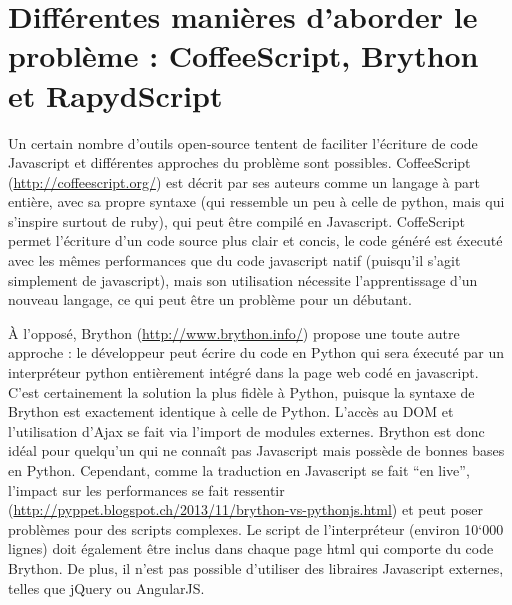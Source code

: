 \documentclass[letterpaper,10pt,french]{sphinxmanual}
\begin{document}
\chapter{Différentes manières d'aborder le problème : CoffeeScript, Brython et RapydScript}
\label{rapydscript:differentes-manieres-d-aborder-le-probleme-coffeescript-brython-et-rapydscript}
Un certain nombre d'outils open-source tentent de faciliter l'écriture de code Javascript et différentes approches du problème sont possibles. CoffeeScript (\href{http://coffeescript.org/}{http://coffeescript.org/}) est décrit par ses auteurs comme un langage à part entière, avec sa propre syntaxe (qui ressemble un peu à celle de python, mais qui s'inspire surtout de ruby), qui peut être compilé en Javascript. CoffeScript permet l'écriture d'un code source plus clair et concis, le code généré est éxecuté avec les mêmes performances que du code javascript natif (puisqu'il s'agit simplement de javascript), mais son utilisation nécessite l'apprentissage d'un nouveau langage, ce qui peut être un problème pour un débutant.

À l'opposé, Brython (\href{http://www.brython.info/}{http://www.brython.info/}) propose une toute autre approche : le développeur peut écrire du code en Python qui sera éxecuté par un interpréteur python entièrement intégré dans la page web codé en javascript. C'est certainement la solution la plus fidèle à Python, puisque la syntaxe de Brython est exactement identique à celle de Python. L'accès au DOM et l'utilisation d'Ajax se fait via l'import de modules externes. Brython est donc idéal pour quelqu'un qui ne connaît pas Javascript mais possède de bonnes bases en Python. Cependant, comme la traduction en Javascript se fait ``en live'', l'impact sur les performances se fait ressentir (\href{http://pyppet.blogspot.ch/2013/11/brython-vs-pythonjs.html}{http://pyppet.blogspot.ch/2013/11/brython-vs-pythonjs.html}) et peut poser problèmes pour des scripts complexes. Le script de l'interpréteur (environ 10`000 lignes) doit également être inclus dans chaque page html qui comporte du code Brython. De plus, il n'est pas possible d'utiliser des libraires Javascript externes, telles que jQuery ou AngularJS.
\end{document}
